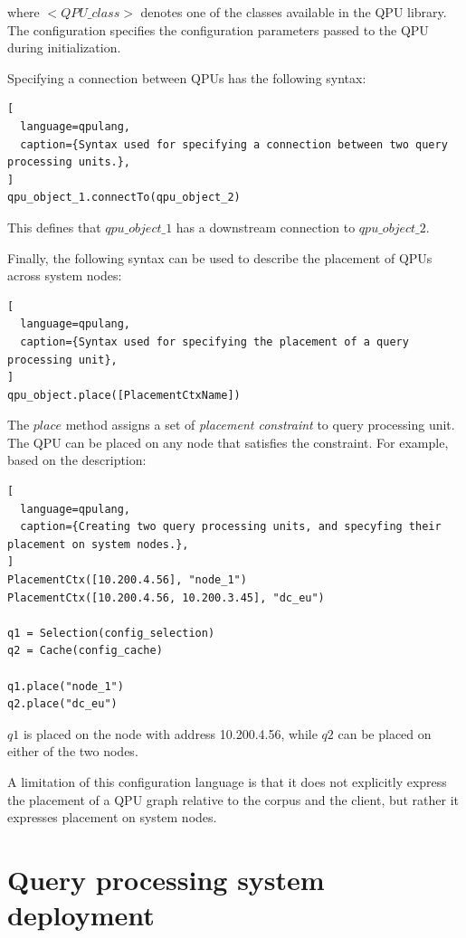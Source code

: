 \noindent
where $<QPU\_class>$ denotes one of the classes available in the QPU library.
The configuration specifies the configuration parameters passed to the QPU during initialization.

\medskip
\noindent
Specifying a connection between QPUs has the following syntax:

\begin{lstlisting}[
  language=qpulang,
  caption={Syntax used for specifying a connection between two query processing units.},
]
qpu_object_1.connectTo(qpu_object_2)
\end{lstlisting}

\noindent
This defines that $qpu\_object\_1$ has a downstream connection to $qpu\_object\_2$.

\medskip
\noindent
Finally, the following syntax can be used to describe the placement of QPUs across system nodes:

\begin{lstlisting}[
  language=qpulang,
  caption={Syntax used for specifying the placement of a query processing unit},
]
qpu_object.place([PlacementCtxName])
\end{lstlisting}

\noindent
The $place$ method assigns a set of \textit{placement constraint} to query processing unit.
The QPU can be placed on any node that satisfies the constraint.
For example, based on the description:

\begin{lstlisting}[
  language=qpulang,
  caption={Creating two query processing units, and specyfing their placement on system nodes.},
]
PlacementCtx([10.200.4.56], "node_1")
PlacementCtx([10.200.4.56, 10.200.3.45], "dc_eu")

q1 = Selection(config_selection)
q2 = Cache(config_cache)

q1.place("node_1")
q2.place("dc_eu")
\end{lstlisting}

\noindent
$q1$ is placed on the node with address 10.200.4.56,
while $q2$ can be placed on either of the two nodes.

\bigskip
\noindent

A limitation of this configuration language is that it does not explicitly express the placement of a QPU graph
relative to the corpus and the client,
but rather it expresses placement on system nodes.


\section{Query processing system deployment}
\label{sec:proteus_deployment}

